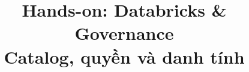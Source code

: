 
\title{\parbox[c][\TitleBlockHeight][c]{0.90\textwidth}{\centering\fontsize{20pt}{24pt}\selectfont\bfseries Hands-on: Databricks \& Governance \\ Catalog, quyền và danh tính}}

\maketitle
\thispagestyle{firstpage}


